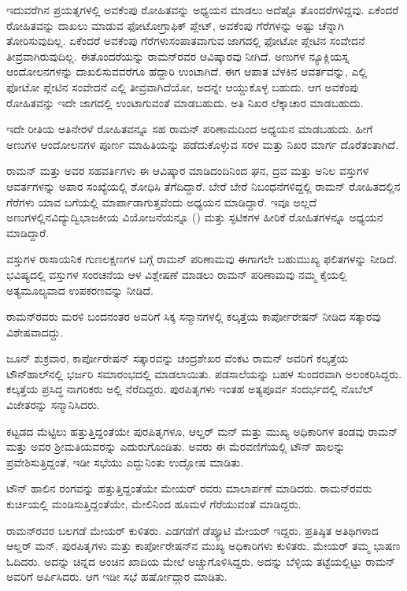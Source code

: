 ಇದುವರೆಗಿನ ಪ್ರಯತ್ನಗಳಲ್ಲಿ ಅವಕೆಂಪು ರೋಹಿತವನ್ನು ಅಧ್ಯಯನ ಮಾಡಲು ಅದೆಷ್ಟೊ ತೊಂದರೆಗಳಿದ್ದವು. ಏಕೆಂದರೆ ರೋಹಿತವನ್ನು ದಾಖಲು ಮಾಡುವ ಫೋಟೋಗ್ರಾಫಿಕ್ ಪ್ಲೇಟ್, ಅವಕೆಂಪು ಗೆರೆಗಳನ್ನು ಅಷ್ಟು ಚೆನ್ನಾಗಿ ತೋರಿಸುವುದಿಲ್ಲ. ಏಕೆಂದರೆ ಅವಕೆಂಪು ಗೆರೆಗಳು\break ಸಂಪಾತವಾಗುವ ಜಾಗದಲ್ಲಿ ಫೋಟೋ ಪ್ಲೇಟಿನ ಸಂವೇದನೆ ತೀವ್ರವಾಗಿರುವುದಿಲ್ಲ. ಈ\break ತೊಂದರೆಯನ್ನು ರಾಮನ್‍ರವರ ಆವಿಷ್ಕಾರವು ನೀಗಿದೆ. ಅಣುಗಳ ನ್ಯೂಕ್ಲಿಯಸ್ನ ಆಂದೋಲನಗಳನ್ನು ದಾಖಲಿಸುವವರೆಗೂ ಹೆದ್ದಾರಿ ಉಂಟಾಗಿದೆ. ಈಗ ಆಪಾತ ಬೆಳಕಿನ ಆವರ್ತವನ್ನು, ಎಲ್ಲಿ ಫೋಟೋ ಪ್ಲೇಟಿನ ಸಂವೇದನೆ ಎಲ್ಲಿ ತೀವ್ರವಾಗಿದೆಯೋ, ಅದನ್ನೇ ಆಯ್ದುಕೊಳ್ಳ ಬಹುದು. ಆಗ ಅವಕೆಂಪು ರೋಹಿತವನ್ನು ಇದೇ ಜಾಗದಲ್ಲಿ ಉಂಟಾಗುವಂತೆ ಮಾಡಬಹುದು. ಅತಿ ನಿಖರ ಲೆಕ್ಕಾಚಾರ ಮಾಡಬಹುದು.

\newpage

ಇದೇ ರೀತಿಯ ಅತಿನೇರಳೆ ರೋಹಿತವನ್ನೂ ಸಹ ರಾಮನ್ ಪರಿಣಾಮದಿಂದ ಅಧ್ಯಯನ ಮಾಡಬಹುದು. ಹೀಗೆ ಅಣುಗಳ ಆಂದೋಲನಗಳ ಪೂರ್ಣ ಮಾಹಿತಿಯನ್ನು ಪಡೆದುಕೊಳ್ಳುವ ಸರಳ ಮತ್ತು ನಿಖರ ಮಾರ್ಗ ದೊರೆತಂತಾಗಿದೆ.

ರಾಮನ್ ಮತ್ತು ಅವರ ಸಹವರ್ತಿಗಳು ಈ ಆವಿಷ್ಕಾರ ಮಾಡಿದಂದಿನಿಂದ ಘನ, ದ್ರವ ಮತ್ತು ಅನಿಲ ವಸ್ತುಗಳ ಆವರ್ತಗಳನ್ನು ಅಪಾರ ಸಂಖ್ಯೆಯಲ್ಲಿ ಶೋಧಿಸಿ ತೆಗೆದಿದ್ದಾರೆ. ಬೇರೆ ಬೇರೆ ನಿಬಂಧನೆಗಳಿದ್ದಲ್ಲಿ ರಾಮನ್ ರೋಹಿತದಲ್ಲಿನ ಗೆರೆಗಳು ಯಾವ ಬಗೆಯಲ್ಲಿ ಮಾರ್ಪಾಡಾಗುತ್ತವೆಂದು ಅಧ್ಯಯನ ಮಾಡಿದ್ದಾರೆ. ಇವೂ ಅಲ್ಲದೆ ಅಣುಗಳಲ್ಲಿನ\break ವಿದ್ಯುದ್ವಿಭಾಜಕೀಯ ವಿಯೋಜನೆಯನ್ನೂ () ಮತ್ತು ಸ್ಫಟಿಕಗಳ ಹೀರಿಕೆ ರೋಹಿತಗಳನ್ನೂ ಅಧ್ಯಯನ ಮಾಡಿದ್ದಾರೆ.

ವಸ್ತುಗಳ ರಾಸಾಯನಿಕ ಗುಣಲಕ್ಷಣಗಳ ಬಗ್ಗೆ ರಾಮನ್ ಪರಿಣಾಮವು ಈಗಾಗಲೇ ಬಹುಮುಖ್ಯ ಫಲಿತಗಳನ್ನು ನೀಡಿದೆ. ಭವಿಷ್ಯದಲ್ಲಿ ವಸ್ತುಗಳ ಸಂರಚನೆಯ ಆಳ ವಿಶ್ಲೇಷಣೆ ಮಾಡಲು ರಾಮನ್ ಪರಿಣಾಮವು ನಮ್ಮ ಕೈಯಲ್ಲಿ ಅತ್ಯಮೂಲ್ಯವಾದ ಉಪಕರಣವನ್ನು ನೀಡಿದೆ.



ರಾಮನ್‍ರವರು ಮರಳಿ ಬಂದನಂತರ ಅವರಿಗೆ ಸಿಕ್ಕ ಸನ್ಮಾನಗಳಲ್ಲಿ ಕಲ್ಕತ್ತೆಯ ಕಾರ್ಪೋರೇಷನ್ ನೀಡಿದ ಸತ್ಕಾರವು ವಿಶೇಷವಾದದ್ದು.

ಜೂನ್  ಶುಕ್ರವಾರ, ಕಾರ್ಪೋರೇಷನ್ ಸತ್ಕಾರವನ್ನು ಚಂದ್ರಶೇಖರ ವೆಂಕಟ ರಾಮನ್ ಅವರಿಗೆ ಕಲ್ಕತ್ತೆಯ ಟೌನ್‍ಹಾಲ್‍ನಲ್ಲಿ ಭರ್ಜರಿ ಸಮಾರಂಭದಲ್ಲಿ ಮಾಡಲಾಯಿತು. ಪಡಸಾಲೆಯನ್ನು ಬಹಳ ಸುಂದರವಾಗಿ ಅಲಂಕರಿಸಿದ್ದರು. ಕಲ್ಕತ್ತೆಯ ಪ್ರಸಿದ್ಧ ನಾಗರಿಕರು ಅಲ್ಲಿ ನೆರೆದಿದ್ದರು. ಪುರಪಿತೃಗಳು ಇಂತಹ ಅತ್ಯಪೂರ್ವ ಸಂದರ್ಭದಲ್ಲಿ ನೊಬೆಲ್ ವಿಜೇತರನ್ನು ಸನ್ಮಾನಿಸಿದರು.

ಕಟ್ಟಡದ ಮೆಟ್ಟಿಲು ಹತ್ತುತ್ತಿದ್ದಂತೆಯೇ ಪುರಪಿತೃಗಳೂ, ಆಲ್ಡರ್ ಮನ್ ಮತ್ತು ಮುಖ್ಯ ಅಧಿಕಾರಿಗಳ ತಂಡವು ರಾಮನ್ ಮತ್ತು ಅವರ ಶ‍್ರೀಮತಿಯವರನ್ನು ಎದುರುಗೊಂಡಿತು. ಅವರು ಈ ಮೆರವಣಿಗೆಯಲ್ಲಿ ಟೌನ್ ಹಾಲನ್ನು ಪ್ರವೇಶಿಸುತ್ತಿದ್ದಂತೆ, ಇಡೀ ಸಭೆಯು ಎದ್ದುನಿಂತು ಉದ್ಘೋಷ ಮಾಡಿತು.

ಟೌನ್ ಹಾಲಿನ ರಂಗವನ್ನು ಹತ್ತುತ್ತಿದ್ದಂತೆಯೇ ಮೇಯರ್ ರವರು ಮಾಲಾರ್ಪಣೆ ಮಾಡಿದರು. ರಾಮನ್‍ರವರು ಕುರ್ಚಿಯಲ್ಲಿ ಮಂಡಿಸುತ್ತಿದ್ದಂತೆಯೇ, ಮೇಲಿನಿಂದ ಹೂಮಳೆ ಗೆರೆಯುವಂತೆ ಮಾಡಿದ್ದರು.

ರಾಮನ್‍ರವರ ಬಲಗಡೆ ಮೇಯರ್ ಕುಳಿತರು. ಎಡಗಡೆಗೆ ಡೆಪ್ಯೂಟಿ ಮೇಯರ್ ಇದ್ದರು. ಪ್ರತಿಷ್ಠಿತ ಅತಿಥಿಗಳಾದ ಆಲ್ಡರ್ ಮನ್, ಪುರಪಿತೃಗಳು ಮತ್ತು ಕಾರ್ಪೋರೇಷನ್‍ನ ಮುಖ್ಯ ಅಧಿಕಾರಿಗಳು ಕುಳಿತರು. ಮೇಯರ್ ತಮ್ಮ ಭಾಷಣ ಓದಿದರು. ಅದನ್ನು ಚಿನ್ನದ ಅಂಚಿನ ಖಾದಿಯ ಮೇಲೆ ಅಚ್ಚುಗೊಳಿಸಿದ್ದರು. ಅದನ್ನು ಬೆಳ್ಳಿಯ ತಟ್ಟೆಯಲ್ಲಿಟ್ಟು ರಾಮನ್ ಅವರಿಗೆ ಅರ್ಪಿಸಿದರು. ಆಗ ಇಡೀ ಸಭೆ ಹರ್ಷೋದ್ಗಾರ ಮಾಡಿತು.

